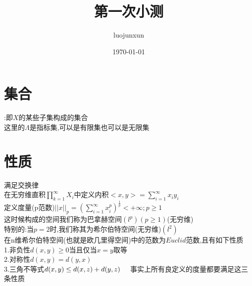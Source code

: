 \documentclass[12pt, a4paper, oneside]{ctexart}
\title{\huge\textbf{第一次小测}}
\author{luojunxun}
\date{\today}
\begin{document}
\maketitle


\section*{集合}
:即$X$的某些子集构成的集合
\\
这里的$\Lambda$是指标集,可以是有限集也可以是无限集

\section*{性质}


 满足交换律
\\
在无穷维直积$\prod\limits_{k=1}^\infty X_i$中定义内积$<x,y>=\sum\limits_{i=1}^\infty x_iy_i$\\
定义度量(p范数)$||x||_p=(\sum\limits_{i=1}^\infty x_i^p)^{\frac{1}{p}}<+\infty;p\geq 1$\\
    这时候构成的空间我们称为巴拿赫空间$(l^p)(p\geq 1)$(无穷维)\\
    特别的:当$p=2$时,我们称其为希尔伯特空间(无穷维)$(l^2)$\\
    
    在n维希尔伯特空间(也就是欧几里得空间)中的范数为$Euclid$范数,且有如下性质\\
    1.非负性$d(x,y)\geq 0$当且仅当$x=y$取等\\
    2.对称性$d(x,y)=d(y,x)$\\
    3.三角不等式$d(x,y)\leq d(x,z)+d(y,z)\\\quad$
    事实上所有良定义的度量都要满足这三条性质
    
\end{document}

